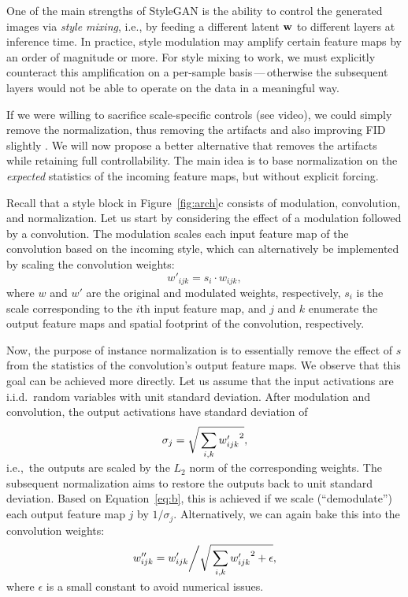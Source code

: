 \documentclass[10pt,twocolumn,letterpaper]{article}
\newcommand{\FINAL}[2][]{#2} %
\newcommand{\ww}{{\bf w}}
\begin{document}
\FINAL{One of the main strengths of StyleGAN is the ability to control the generated images via \emph{style mixing}, i.e., by feeding a different latent $\ww$ to different layers at inference time. In practice, style modulation may amplify certain feature maps by an order of magnitude or more.
For style mixing to work, we must explicitly counteract this amplification on a per-sample basis\,---\,otherwise the subsequent layers would not be able to operate on the data in a meaningful way.

If we were willing to sacrifice scale-specific controls (see video), we could simply remove the normalization, thus removing the artifacts and also improving FID slightly \cite{Tuomas2019}.
We will now propose a better alternative that removes the artifacts while retaining full controllability.}
The main idea is to base normalization on the \emph{expected} statistics of the incoming feature maps, but without explicit forcing.

Recall that a style block in Figure~\ref{fig:arch}c consists of modulation, convolution, and normalization. 
Let us start by considering the effect of a modulation followed by a convolution. The modulation scales each input feature map of the convolution based on the incoming style, which can alternatively be implemented by scaling the convolution weights:
\begin{equation}
\label{eq:modulation}
w'_{ijk} = s_i \cdot w_{ijk},
\end{equation}
where $w$ and $w'$ are the original and modulated weights, respectively, $s_i$ is the scale corresponding to the $i$th input feature map, and $j$ and $k$ enumerate the output feature maps and spatial footprint of the convolution, respectively.

Now, the purpose of instance normalization is to essentially remove the effect of $s$ from the statistics of the convolution's output feature maps.
We observe that this goal can be achieved more directly. %
Let us assume that the input activations are i.i.d.~random variables with unit standard deviation. After modulation and convolution, the output activations have standard deviation of
\begin{equation}
\sigma_j = \sqrt{\raisebox{0mm}[4.0mm][2.5mm]{$\underset{i,k}{{}\displaystyle\sum{}}$} {w'_{ijk}}^2},
\label{eq:b}
\end{equation}
i.e.,~the outputs are scaled by the $L_2$ norm of the corresponding weights. The subsequent normalization aims to restore the outputs back to unit standard deviation.
Based on Equation~\ref{eq:b}, this is achieved if we scale (``demodulate'') each output feature map $j$ by  $1/\sigma_j$. Alternatively, we can again bake this into the convolution weights:
\begin{equation}
w''_{ijk} = w'_{ijk} \bigg/ \sqrt{\raisebox{0mm}[4.0mm][2.5mm]{$\underset{i,k}{{}\displaystyle\sum{}}$} {w'_{ijk}}^2 + \epsilon},
\label{eq:demodulation}
\end{equation}
where $\epsilon$ is a small constant to avoid numerical issues.
\end{document}
